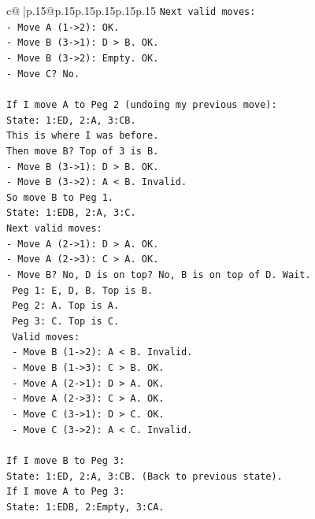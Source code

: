 \documentclass{article}
\begin{document}
{\begin{supertabular}{c@{$\;$}|p{.15\linewidth}@{}p{.15\linewidth}p{.15\linewidth}p{.15\linewidth}p{.15\linewidth}p{.15\linewidth}}
{{{\texttt{Next valid moves:} \\
\texttt{{-} Move A (1{-}>2): OK.} \\
\texttt{{-} Move B (3{-}>1): D > B. OK.} \\
\texttt{{-} Move B (3{-}>2): Empty. OK.} \\
\texttt{{-} Move C? No.} \\
\\ 
\texttt{If I move A to Peg 2 (undoing my previous move):} \\
\texttt{State: 1:ED, 2:A, 3:CB.} \\
\texttt{This is where I was before.} \\
\texttt{Then move B? Top of 3 is B.} \\
\texttt{{-} Move B (3{-}>1): D > B. OK.} \\
\texttt{{-} Move B (3{-}>2): A < B. Invalid.} \\
\texttt{So move B to Peg 1.} \\
\texttt{State: 1:EDB, 2:A, 3:C.} \\
\texttt{Next valid moves:} \\
\texttt{{-} Move A (2{-}>1): D > A. OK.} \\
\texttt{{-} Move A (2{-}>3): C > A. OK.} \\
\texttt{{-} Move B? No, D is on top? No, B is on top of D. Wait.} \\
\texttt{  Peg 1: E, D, B. Top is B.} \\
\texttt{  Peg 2: A. Top is A.} \\
\texttt{  Peg 3: C. Top is C.} \\
\texttt{  Valid moves:} \\
\texttt{  {-} Move B (1{-}>2): A < B. Invalid.} \\
\texttt{  {-} Move B (1{-}>3): C > B. OK.} \\
\texttt{  {-} Move A (2{-}>1): D > A. OK.} \\
\texttt{  {-} Move A (2{-}>3): C > A. OK.} \\
\texttt{  {-} Move C (3{-}>1): D > C. OK.} \\
\texttt{  {-} Move C (3{-}>2): A < C. Invalid.} \\
\\ 
\texttt{If I move B to Peg 3:} \\
\texttt{State: 1:ED, 2:A, 3:CB. (Back to previous state).} \\
\texttt{If I move A to Peg 3:} \\
\texttt{State: 1:EDB, 2:Empty, 3:CA.} \\
}}}
\end{supertabular}}
\end{document}
